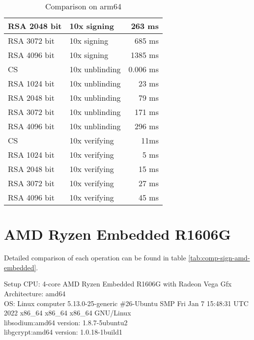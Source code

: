 \begin{table}[ht]
\begin{tabular}{llr}
        RSA 2048 bit & 10x signing & 263 ms \\\hline
        RSA 3072 bit & 10x signing & 685 ms \\\hline
        RSA 4096 bit & 10x signing & 1385 ms \\\hline
        \hline
        CS & 10x unblinding & 0.006 ms \\\hline
        RSA 1024 bit & 10x unblinding &  23 ms \\\hline
        RSA 2048 bit & 10x unblinding &  79 ms \\\hline
        RSA 3072 bit & 10x unblinding & 171 ms \\\hline
        RSA 4096 bit & 10x unblinding & 296 ms \\\hline
        \hline
        CS & 10x verifying & 11ms \\\hline
        RSA 1024 bit & 10x verifying &  5 ms \\\hline
        RSA 2048 bit & 10x verifying & 15 ms \\\hline
        RSA 3072 bit & 10x verifying & 27 ms \\\hline
        RSA 4096 bit & 10x verifying & 45 ms \\\hline
    \end{tabular}
    \caption{Comparison on arm64}
    \label{tab:comp-sign-arm64}
\end{table}

\section{AMD Ryzen Embedded R1606G}
Detailed comparison of each operation can be found in table \ref{tab:comp-sign-amd-embedded}.
\begin{bfhBox}{Setup}
	CPU: 4-core AMD Ryzen Embedded R1606G with Radeon Vega Gfx\\
    Architecture: amd64 \\
    OS: Linux computer 5.13.0-25-generic \#26-Ubuntu SMP Fri Jan 7 15:48:31 UTC 2022 x86\_64 x86\_64 x86\_64 GNU/Linux\\
    libsodium:amd64 version: 1.8.7-5ubuntu2  \\ 
    libgcrypt:amd64 version: 1.0.18-1build1
\end{bfhBox}

